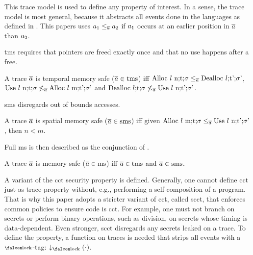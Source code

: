 \documentclass[utf8,acmsmall,review,screen,dvipsnames]{acmart}
\begin{document}
This trace model is used to define any property of interest.
In a sense, the trace model is most general, because it abstracts all events done in the languages as defined in .
This papers uses $\event[_{1}]\le_{\trace}\event[_{2}]$ if $\event[_{1}]$ occurs at an earlier position in $\trace$ than $\event[_{2}]$.

\gls{tms} requires that pointers are freed exactly once and that no use happens after a free.

\begin{definition}\label{def:trace:tmsdef}
  A trace $\trace$ is temporal memory safe ($\trace\in\tmssafe$) iff $\ev{Alloc\ \loc\ n;\sandboxtag;\securitytag}\le_{\trace}\ev{Dealloc\ \loc;\sandboxtag';\securitytag'}$, $\ev{Use\ \loc\ n;\sandboxtag;\securitytag}\not\le_{\trace}\ev{Alloc\ \loc\ m;\sandboxtag';\securitytag'}$ and $\ev{Dealloc\ \loc;\sandboxtag;\securitytag}\not\le_{\trace}\ev{Use\ \loc\ n;\sandboxtag';\securitytag'}$.
\end{definition}

\gls{sms} disregards out of bounds accesses.

\begin{definition}\label{def:trace:smsdef}
  A trace $\trace$ is spatial memory safe ($\trace\in\smssafe$) iff given $\ev{Alloc\ \loc\ m;\sandboxtag;\securitytag}\le_{\trace}\ev{Use\ \loc\ n;\sandboxtag';\securitytag'}$, then $n<m$.
\end{definition}

Full \gls{ms} is then described as the conjunction of .

\begin{definition}[\glsfirst{ms}]\label{def:trace:msdef}
  A trace $\trace$ is memory safe ($\trace\in\mssafe$) iff $\trace\in\tmssafe$ and $\trace\in\smssafe$.
\end{definition}

A variant of the \gls{cct} security property is defined.
Generally, one cannot define \gls{cct} just as trace-property without, e.g., performing a self-composition of a program.
That is why this paper adopts a stricter variant of \gls{cct}, called \gls{scct}, that enforces common policies to ensure code is \gls{cct}.
For example, one must not branch on secrets or perform binary operations, such as division, on secrets whose timing is data-dependent.
Even stronger, \gls{scct} disregards any secrets leaked on a trace.
To define the property, a function on traces is needed that strips all events with a $\lock$-tag: $\downarrow_{\lock}(\cdot)$.
\end{document}
